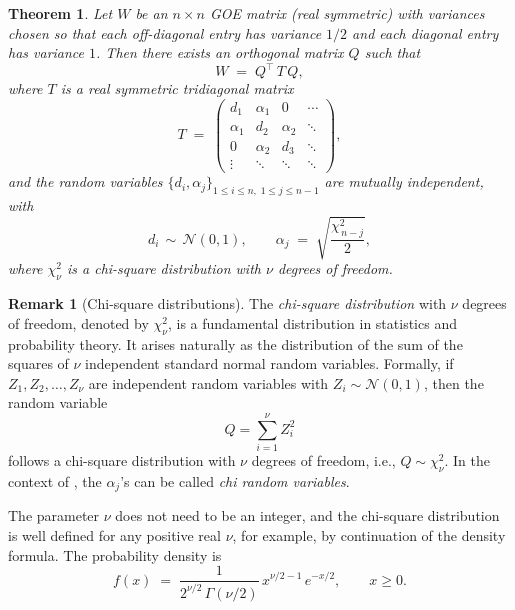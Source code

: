 \documentclass[letterpaper,11pt,oneside,reqno]{book}
\numberwithin{equation}{chapter}  %
\newtheorem{theorem}[proposition]{Theorem}
\theoremstyle{definition}
\newtheorem{remark}[proposition]{Remark}
\begin{document}
\begin{theorem}
\label{lecture4:thm:DE-model}
Let \(W\) be an \(n\times n\) GOE matrix (real symmetric) with variances chosen so that each off-diagonal entry has variance \(1/2\) and each diagonal entry has variance \(1\).  Then there exists an orthogonal matrix \(Q\) such that
\[
   W \;=\; Q^\top\,T\,Q,
\]
where \(T\) is a real symmetric tridiagonal matrix
\begin{equation}
	\label{lecture4:eq:tridiagonal-form}
   T \;=\; \begin{pmatrix}
         d_1 & \alpha_1 & 0 & \cdots \\
         \alpha_1 & d_2 & \alpha_2 & \ddots \\
         0 & \alpha_2 & d_3 & \ddots \\
         \vdots & \ddots & \ddots & \ddots
       \end{pmatrix},
\end{equation}
and the random variables \(\{d_i,\alpha_j\}_{1 \le i \le n,\;1\le j\le n-1}\) are mutually independent, with
\[
  d_i \,\sim\, \mathcal{N}(0,1),
  \qquad
  \alpha_j \;=\; \sqrt{\frac{\chi^2_{\,n-j}}{2}},
\]
where \(\chi^2_{\nu}\) is a chi-square distribution with \(\nu\) degrees of freedom.
\end{theorem}

\begin{remark}[Chi-square distributions]
The \emph{chi-square distribution} with \(\nu\) degrees of
freedom, denoted by \(\chi^2_{\nu}\), is a fundamental
distribution in statistics and probability theory. It arises
naturally as the distribution of the sum of the squares of
\(\nu\) independent standard normal random variables.
Formally, if \(Z_1, Z_2, \ldots, Z_{\nu}\) are independent
random variables with \(Z_i \sim \mathcal{N}(0,1)\), then
the random variable
\[
  Q = \sum_{i=1}^{\nu} Z_i^2
\]
follows a chi-square distribution with \(\nu\) degrees of
freedom, i.e., \(Q \sim \chi^2_{\nu}\). In the context of
, the $\alpha_j$'s can be called \emph{chi random variables}.

The parameter $\nu$ does not need to be an integer, and the
chi-square distribution is well defined for any positive
real $\nu$, for example, by continuation of the density formula.
The probability density is
\begin{equation*}
	f(x) \;=\; \frac{1}{2^{\nu/2}\,\Gamma(\nu/2)}\,x^{\nu/2-1}\,e^{-x/2},
	\qquad x\ge 0.
\end{equation*}
\end{remark}
\end{document}
